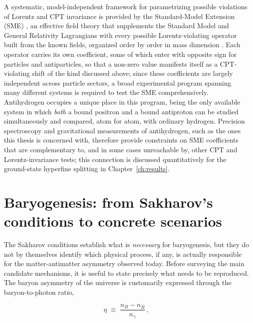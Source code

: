 A systematic, model-independent framework for parametrizing possible violations of Lorentz and CPT invariance is provided by the Standard-Model Extension (SME) \cite{ColladayKostelecky1997,ColladayKostelecky1998}, an effective field theory that supplements the Standard Model and General Relativity Lagrangians with every possible Lorentz-violating operator built from the known fields, organized order by order in mass dimension \cite{Kostelecky:2015nma,Bluhm_1999}. Each operator carries its own coefficient, some of which enter with opposite sign for particles and antiparticles, so that a non-zero value manifests itself as a CPT-violating shift of the kind discussed above; since these coefficients are largely independent across particle sectors, a broad experimental program spanning many different systems is required to test the SME comprehensively. Antihydrogen occupies a unique place in this program, being the only available system in which \emph{both} a bound positron and a bound antiproton can be studied simultaneously and compared, atom for atom, with ordinary hydrogen. Precision spectroscopy and gravitational measurements of antihydrogen, such as the ones this thesis is concerned with, therefore provide constraints on SME coefficients that are complementary to, and in some cases unreachable by, other CPT and Lorentz-invariance tests; this connection is discussed quantitatively for the ground-state hyperfine splitting in Chapter~\ref{ch:results}.

\section{Baryogenesis: from Sakharov's conditions to concrete scenarios}

The Sakharov conditions establish what is \emph{necessary} for baryogenesis, but they do not by themselves identify which physical process, if any, is actually responsible for the matter-antimatter asymmetry observed today. Before surveying the main candidate mechanisms, it is useful to state precisely what needs to be reproduced. The baryon asymmetry of the universe is customarily expressed through the baryon-to-photon ratio,

\begin{equation}
\eta \;\equiv\; \frac{n_B - n_{\bar{B}}}{n_\gamma} \, ,
\end{equation}

